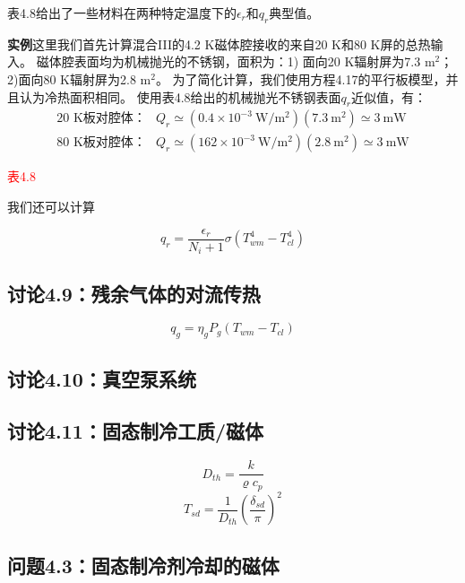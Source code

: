 表4.8给出了一些材料在两种特定温度下的$\epsilon_r$和$q_r$典型值。

\textbf{实例}\qquad 这里我们首先计算混合III的4.2 K磁体腔接收的来自20 K和80 K屏的总热输入。
磁体腔表面均为机械抛光的不锈钢，面积为：1) 面向20 K辐射屏为7.3 $\mathrm{m^2}$；2)面向80 K辐射屏为2.8 $\mathrm{m^2}$。
为了简化计算，我们使用方程4.17的平行板模型，并且认为冷热面积相同。
使用表4.8给出的机械抛光不锈钢表面$q_r$近似值，有：
\begin{align*}
\mbox{20 K板对腔体：} &Q_r\simeq (0.4\times 10^{-3}\ \mathrm{W/m^2})(7.3\ \mathrm{m^2})\simeq 3\ \mathrm{mW}\\
\mbox{80 K板对腔体：} &Q_r\simeq (162\times 10^{-3}\ \mathrm{W/m^2})(2.8\ \mathrm{m^2})\simeq 3\ \mathrm{mW}
\end{align*}

\textcolor{red}{表4.8}

我们还可以计算




\begin{equation}%
q_r=\frac{\epsilon_r}{N_i+1}\sigma(T_{wm}^4-T_{cl}^4)
\end{equation}



\subsection{讨论4.9：残余气体的对流传热}

\begin{equation}%
q_g=\eta_gP_g(T_{wm}-T_{cl})
\end{equation}



\subsection{讨论4.10：真空泵系统}



\subsection{讨论4.11：固态制冷工质/磁体}
\begin{equation}%
D_{th}=\frac{k}{\varrho c_p}
\end{equation}
\begin{equation}%
T_{sd}=\frac{1}{D_{th}}(\frac{\delta_{sd}}{\pi})^2
\end{equation}


\subsection{问题4.3：固态制冷剂冷却的磁体}

